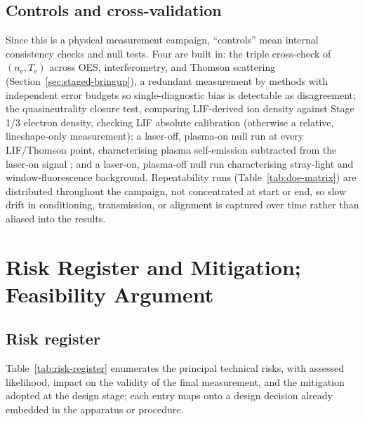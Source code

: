 \subsection{Controls and cross-validation}

Since this is a physical measurement campaign, ``controls'' mean internal consistency checks and null tests. Four are built in: the triple cross-check of $(n_{\mathrm{e}}, T_{\mathrm{e}})$ across OES, interferometry, and Thomson scattering (Section~\ref{sec:staged-bringup}), a redundant measurement by methods with independent error budgets so single-diagnostic bias is detectable as disagreement; the quasineutrality closure test, comparing LIF-derived ion density against Stage 1/3 electron density, checking LIF absolute calibration (otherwise a relative, lineshape-only measurement); a laser-off, plasma-on null run at every LIF/Thomson point, characterising plasma self-emission subtracted from the laser-on signal \cite{ref0304,ref0355}; and a laser-on, plasma-off null run characterising stray-light and window-fluorescence background. Repeatability runs (Table~\ref{tab:doe-matrix}) are distributed throughout the campaign, not concentrated at start or end, so slow drift in conditioning, transmission, or alignment is captured over time rather than aliased into the results.

\section{Risk Register and Mitigation; Feasibility Argument}

\subsection{Risk register}

Table~\ref{tab:risk-register} enumerates the principal technical risks, with assessed likelihood, impact on the validity of the final measurement, and the mitigation adopted at the design stage; each entry maps onto a design decision already embedded in the apparatus or procedure.

